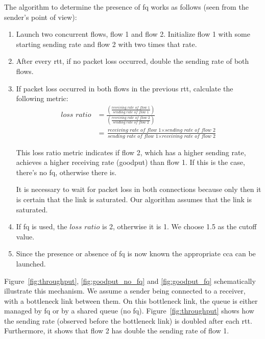 \documentclass[runningheads]{llncs}
\newcommand{\mynote}[3]{
    \fbox{\bfseries\sffamily\scriptsize#1}
    {\small$\blacktriangleright$\textsf{\emph{\color{#3}{#2}}}$\blacktriangleleft$}}
\newcommand{\noteMax}[1]{\mynote{Max}{#1}{green}}
\begin{document}
The algorithm to determine the presence of \gls{fq} works as follows (seen from the sender's point of view):
\begin{enumerate}
\item Launch two concurrent flows, flow 1 and flow 2. Initialize flow 1 with some starting sending rate and flow 2 with two times that rate. 
\item After every \gls{rtt}, if no packet loss occurred, double the sending rate of both flows. 
\item If packet loss occurred in both flows in the previous \gls{rtt}, calculate the following metric: 
\begin{align}
\textit{loss ratio} &= \frac{\left(\frac{\textit{receiving rate of flow 1}}{\textit{sending rate of flow 1}}\right)}{\left(\frac{\textit{receiving rate of flow 2}}{\textit{sending rate of flow 2}}\right)} \\
&= \frac{\textit{receiving rate of flow 1}\times \textit{sending rate of flow 2}}{\textit{sending rate of flow 1} \times \textit{receiving rate of flow 2}}
\end{align}

This loss ratio metric indicates if flow 2, which has a higher sending rate, achieves a higher receiving rate (goodput) than flow 1. If this is the case, there's no \gls{fq}, otherwise there is. 

It is necessary to wait for packet loss in both connections because only then it is certain that the link is saturated. Our algorithm assumes that the link is saturated. 
\item If \gls{fq} is used, the $\textit{loss ratio}$ is 2, otherwise it is 1. We choose 1.5 as the cutoff value. 
\item Since the presence or absence of \gls{fq} is now known the appropriate \gls{cca} can be launched. 
\end{enumerate}

Figure~\ref{fig:throughput}, \ref{fig:goodput_no_fq} and \ref{fig:goodput_fq} schematically illustrate this mechanism. We assume a sender being connected to a receiver, with a bottleneck link between them. On this bottleneck link, the queue is either managed by \gls{fq} or by a shared queue (no \gls{fq}). Figure~\ref{fig:throughput} shows how the sending rate (observed before the bottleneck link) is doubled after each \gls{rtt}. Furthermore, it shows that flow 2 has double the sending rate of flow 1. %
\end{document}
